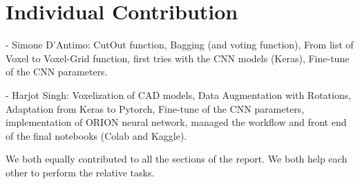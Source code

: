 \documentclass[10pt, conference, letterpaper]{IEEEtran}
\begin{document}




















\section{Individual Contribution}

- Simone D'Antimo: CutOut function, Bagging (and voting function), From list of Voxel to Voxel-Grid function, first tries with the CNN models (Keras), Fine-tune of the CNN parameters.

- Harjot Singh: 
Voxelization of CAD models, Data Augmentation with Rotations, Adaptation from Keras to Pytorch, Fine-tune of the CNN parameters, implementation of ORION neural network, managed the workflow and front end of the final notebooks (Colab and Kaggle).

We both equally contributed to all the sections of the report. We both help each other to perform the relative tasks.
\end{document}
